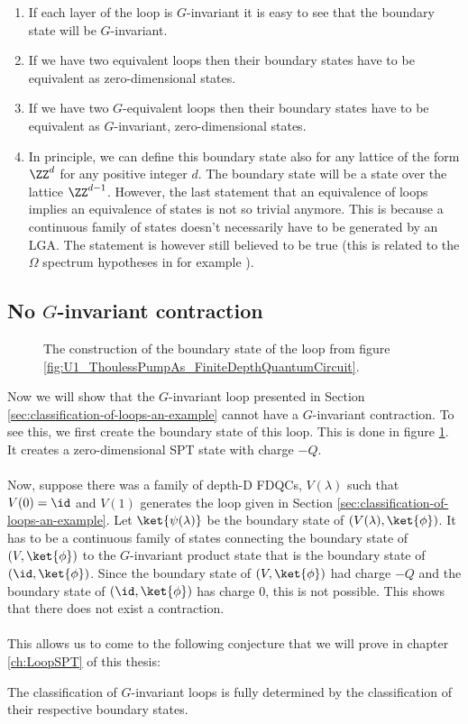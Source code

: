 \begin{enumerate}
	\item If each layer of the loop is $G$-invariant it is easy to see that the boundary state will be $G$-invariant.
	\item If we have two equivalent loops then their boundary states have to be equivalent as zero-dimensional states.
	\item If we have two $G$-equivalent loops then their boundary states have to be equivalent as $G$-invariant, zero-dimensional states.
	\item In principle, we can define this boundary state also for any lattice of the form $\ZZ^d$ for any positive integer $d$. The boundary state will be a state over the lattice $\ZZ^{d-1}$. However, the last statement that an equivalence of loops implies an equivalence of states is not so trivial anymore. This is because a continuous family of states doesn't necessarily have to be generated by an LGA. The statement is however still believed to be true (this is related to the $\Omega$ spectrum hypotheses in for example \cite{xiong2019classification}).
\end{enumerate}

\subsection{No \texorpdfstring{$G$}{G}-invariant contraction}
\begin{figure}
	\centering
	\scalebox{0.75}{
		
	}
	\caption{The construction of the boundary state of the loop from figure \ref{fig:U1_ThoulessPumpAs_FiniteDepthQuantumCircuit}.}
	\label{fig:U1_ThoulessPumpAs_FiniteDepthQuantumCircuit_Boundary}
\end{figure}
Now we will show that the $G$-invariant loop presented in Section \ref{sec:classification-of-loops-an-example} cannot have a $G$-invariant contraction. To see this, we first create the boundary state of this loop. This is done in figure \ref{fig:U1_ThoulessPumpAs_FiniteDepthQuantumCircuit_Boundary}. It creates a zero-dimensional SPT state with charge $-Q$.\\\\
Now, suppose there was a family of depth-D FDQCs, $V(\lambda)$ such that $V(0)=\id$ and $V(1)$ generates the loop given in Section \ref{sec:classification-of-loops-an-example}. Let $\ket{\psi(\lambda)}$ be the boundary state of $(V(\lambda),\ket{\phi})$. It has to be a continuous family of states connecting the boundary state of $(V,\ket{\phi})$ to the $G$-invariant product state that is the boundary state of $(\id,\ket{\phi})$. Since the boundary state of $(V,\ket{\phi})$ had charge $-Q$ and the boundary state of $(\id,\ket{\phi})$ has charge $0$, this is not possible. This shows that there does not exist a contraction.\\\\
This allows us to come to the following conjecture that we will prove in chapter \ref{ch:LoopSPT} of this thesis:
\begin{conjecture}
	The classification of $G$-invariant loops is fully determined by the classification of their respective boundary states.
\end{conjecture}
